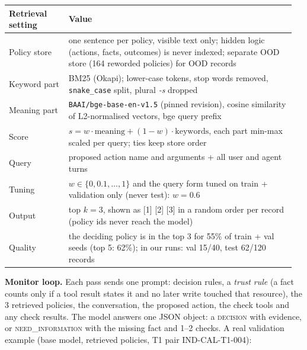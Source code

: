 \documentclass[10pt]{article}
\begin{document}
\begin{center}\small
\begin{tabular}{@{}L{0.2\linewidth}L{0.76\linewidth}@{}}
\toprule
\textbf{Retrieval setting} & \textbf{Value}\\
\midrule
Policy store & one sentence per policy, visible text only; hidden logic (actions, facts, outcomes) is never indexed; separate OOD store (164 reworded policies) for OOD records\\
Keyword part & BM25 (Okapi); lower-case tokens, stop words removed, \texttt{snake\_case} split, plural \emph{-s} dropped\\
Meaning part & \texttt{BAAI/bge-base-en-v1.5} (pinned revision), cosine similarity of L2-normalised vectors, bge query prefix\\
Score & $s = w\cdot\mathrm{meaning} + (1-w)\cdot\mathrm{keywords}$, each part min-max scaled per query; ties keep store order\\
Query & proposed action name and arguments + all user and agent turns\\
Tuning & $w \in \{0, 0.1, \dots, 1\}$ and the query form tuned on train + validation only (never test): $w = 0.6$\\
Output & top $k = 3$, shown as [1] [2] [3] in a random order per record (policy ids never reach the model)\\
\midrule
Quality & the deciding policy is in the top 3 for 55\% of train + val seeds (top 5: 62\%); in our runs: val 15/40, test 62/120 records\\
\bottomrule
\end{tabular}
\end{center}

\textbf{Monitor loop.} Each pass sends one prompt: decision rules, a \emph{trust rule} (a fact counts only if a tool
result states it and no later write touched that resource), the 3 retrieved policies, the conversation, the proposed action, the check tools and
any check results. The model answers one JSON object: a \textsc{decision} with evidence, or \textsc{need\_information}
with the missing fact and 1--2 checks. A real validation example (base model, retrieved policies, T1 pair
IND-CAL-T1-004):
\end{document}

